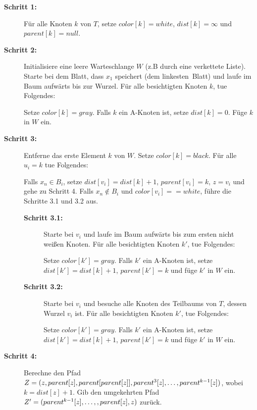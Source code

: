 \documentclass[11pt]{article}
\newcommand{\n}{\newline}
\begin{document}
    \begin{description}
    	\item[\textbf{Schritt 1:}] Für alle Knoten $k$ von $T$, setze $color[k] = white$, $dist[k] = \infty$ und $parent[k] = null$.
    	
    	\item[\textbf{Schritt 2:}] Initialisiere eine leere Warteschlange $W$ (z.B durch eine verkettete Liste).
    	Starte bei dem Blatt, dass $x_1$ speichert (dem \glqq linkesten\grqq\ Blatt) und laufe im Baum aufwärts bis zur Wurzel. 
    	Für alle besichtigten Knoten $k$, tue Folgendes: 
    	
		    Setze $color[k] = gray$.
    		Falls $k$ ein A-Knoten ist, setze $dist[k] = 0$.
    		Füge $k$ in $W$ ein.
    		
    	\item[\textbf{Schritt 3:}] Entferne das erste Element $k$ von $W$. Setze $color[k] = black$.
    	Für alle $u_i = k$ tue Folgendes:
    	
    	Falls $x_n \in B_i$, setze $dist[v_i] = dist[k] + 1$, $parent[v_i] = k$, $z = v_i$ und gehe zu Schritt 4.\n
    	Falls $x_n \notin B_i$ und $color[v_i] == white$, führe die Schritte 3.1 und 3.2 aus.
    	\begin{description}
    		\item[\textbf{Schritt 3.1:}] Starte bei $v_i$ und laufe im Baum aufwärts bis zum ersten nicht weißen Knoten. Für alle besichtigten Knoten $k'$, tue Folgendes:
    		
    		Setze $color[k'] = gray$. Falls $k'$ ein A-Knoten ist, setze $dist[k'] = dist[k]+1$, $parent[k'] = k$ und füge $k'$ in $W$ ein.
    		
    		\item[\textbf{Schritt 3.2:}] Starte bei $v_i$ und besuche alle Knoten des Teilbaums von $T$, dessen Wurzel $v_i$ ist. Für alle besichtigten Knoten $k'$, tue Folgendes:
    		
    		Setze $color[k'] = gray$. Falls $k'$ ein A-Knoten ist, setze $dist[k'] = dist[k] + 1$, $parent[k']	= k$ und füge $k'$ in $W$ ein.
    	\end{description}
    	
    	\item[\textbf{Schritt 4:}] Berechne den Pfad $Z = (z, parent[z], parent[parent[z]], parent^3[z],  \mathellipsis, parent^{k-1}[z])$, wobei $k = dist[z] + 1$. Gib den umgekehrten Pfad $Z' = (parent^{k-1}[z], \mathellipsis,, parent[z], z)$ zurück.
    \end{description}
    
\end{document}
